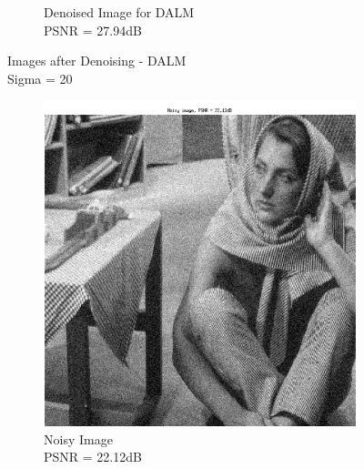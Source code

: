 \documentclass{article} %
\begin{document}
\begin{figure}[H]
\begin{subfigure}[b]{0.5\textwidth}
                \caption{Denoised Image for DALM\\PSNR = 27.94dB}
                \label{fig:DenoisedDALM}
        \end{subfigure}
        \caption{Images after Denoising - DALM\\Sigma = 20}\label{fig:DenoiseDALM}
\end{figure}


\begin{figure}[H]
        \centering
        \begin{subfigure}[b]{0.5\textwidth}
                \includegraphics[width=\textwidth]{images/Noisy}
                \caption{Noisy Image\\PSNR = 22.12dB}
                \label{fig:NoisyIm}
        \end{subfigure}%
        ~ %
        \begin{subfigure}[b]{0.5\textwidth}

\end{subfigure}
\end{figure}
\end{document}

